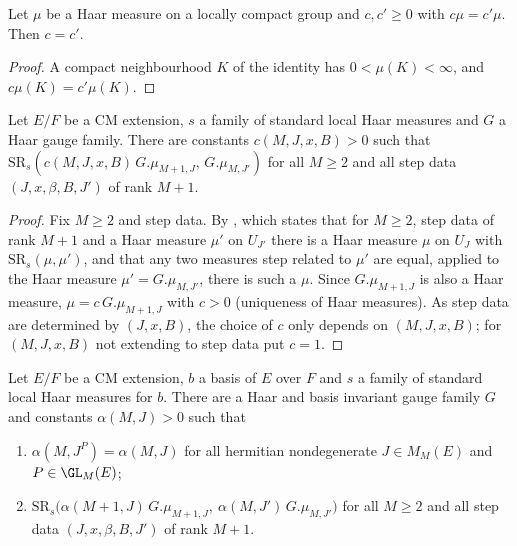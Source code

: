 \begin{lemma}\label{pf:baselat1:haarinj}
Let $\mu$ be a Haar measure on a locally compact group and $c,c'\ge0$ with $c\mu=c'\mu$. Then $c=c'$.
\end{lemma}

\begin{proof}
A compact neighbourhood $K$ of the identity has $0<\mu(K)<\infty$, and $c\mu(K)=c'\mu(K)$.
\end{proof}

\begin{lemma}\label{pf:baselat1:stepconst}
Let $E/F$ be a CM extension, $s$ a family of standard local Haar measures and $G$ a Haar gauge family. There are
constants $c(M,J,x,B)>0$ such that $\mathrm{SR}_s(c(M,J,x,B)\,G.\mu_{M+1,J},\,G.\mu_{M,J'})$ for all $M\ge2$ and all step
data $(J,x,\beta,B,J')$ of rank $M+1$.
\end{lemma}

\begin{proof}
Fix $M\ge2$ and step data. By , which states
that for $M\ge2$, step data of rank $M+1$ and a Haar measure $\mu'$ on $U_{J'}$ there is a Haar measure $\mu$ on $U_J$
with $\mathrm{SR}_s(\mu,\mu')$, and that any two measures step related to $\mu'$ are equal, applied to the Haar measure
$\mu'=G.\mu_{M,J'}$, there is such a $\mu$. Since $G.\mu_{M+1,J}$ is also a Haar measure, $\mu=c\,G.\mu_{M+1,J}$ with
$c>0$ (uniqueness of Haar measures). As step data are determined by $(J,x,B)$, the choice of $c$ only depends on
$(M,J,x,B)$; for $(M,J,x,B)$ not extending to step data put $c=1$.
\end{proof}

\begin{lemma}\label{pf:baselat1:stdfamily}
Let $E/F$ be a CM extension, $b$ a basis of $E$ over $F$ and $s$ a family of standard local Haar measures for $b$.
There are a Haar and basis invariant gauge family $G$ and constants $\alpha(M,J)>0$ such that
\begin{enumerate}[label=(\roman*)]
\item $\alpha(M,J^P)=\alpha(M,J)$ for all hermitian nondegenerate $J\in M_M(E)$ and $P\in\GL_M(E)$;
\item $\mathrm{SR}_s\bigl(\alpha(M+1,J)\,G.\mu_{M+1,J},\ \alpha(M,J')\,G.\mu_{M,J'}\bigr)$ for all $M\ge2$ and all step data
  $(J,x,\beta,B,J')$ of rank $M+1$.
\end{enumerate}
\end{lemma}

